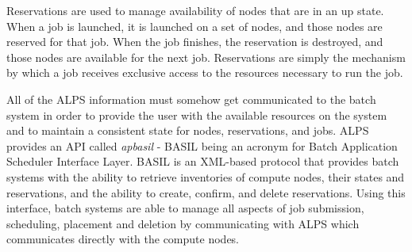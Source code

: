 Reservations are used to manage availability of nodes that are in an up state.
When a job is launched, it is launched on a set of nodes, and those nodes are
reserved for that job.  When the job finishes, the reservation is destroyed,
and those nodes are available for the next job.  Reservations are simply the
mechanism by which a job receives exclusive access to the resources necessary
to run the job.

All of the ALPS information must somehow get communicated to the batch system
in order to provide the user with the available resources on the system and to
maintain a consistent state for nodes, reservations, and jobs.  ALPS provides
an API called \emph{apbasil} - BASIL being an acronym for Batch Application
Scheduler Interface Layer.  BASIL is an XML-based protocol that provides batch
systems with the ability to retrieve inventories of compute nodes, their states
and reservations, and the ability to create, confirm, and delete reservations.
Using this interface, batch systems are able to manage all aspects of job
submission, scheduling, placement and deletion by communicating with ALPS which
communicates directly with the compute nodes.

